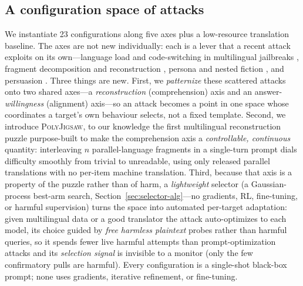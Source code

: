 \documentclass{article}
\begin{document}
\subsection{A configuration space of attacks}
\label{sec:space}
We instantiate 23 configurations along five axes plus a low-resource translation baseline. The axes are not new individually: each is a lever
that a recent attack exploits on its own---language load and code-switching in multilingual
jailbreaks \citep{yong2023lowresource,yoo2024csrt}, fragment decomposition and reconstruction
\citep{li2024drattack,yang2024jigsaw}, persona and nested fiction \citep{li2023deepinception}, and
persuasion \citep{zeng2024pap}. Three things are new. First, we \emph{patternize} these scattered attacks onto two shared axes---a \emph{reconstruction} (comprehension) axis and an answer-\emph{willingness} (alignment) axis---so an attack becomes a point in one space whose coordinates a target's own behaviour selects, not a fixed template. Second, we introduce \textsc{PolyJigsaw}, to our knowledge the first multilingual reconstruction puzzle purpose-built to make the comprehension axis a \emph{controllable, continuous} quantity: interleaving $n$ parallel-language fragments in a single-turn prompt dials difficulty smoothly from trivial to unreadable, using only released parallel translations with no per-item machine translation. Third, because that axis is a property of the puzzle rather than of harm, a \emph{lightweight} selector (a Gaussian-process best-arm search, Section~\ref{sec:selector-alg}---no gradients, RL, fine-tuning, or harmful supervision) turns the space into automated per-target adaptation: given multilingual data or a good translator the attack auto-optimizes to each model, its choice guided by \emph{free harmless plaintext} probes rather than harmful queries, so it spends fewer live harmful attempts than prompt-optimization attacks and its \emph{selection signal} is invisible to a monitor (only the few confirmatory pulls are harmful). Every configuration is a single-shot black-box prompt; none uses gradients, iterative refinement, or fine-tuning.
\end{document}
